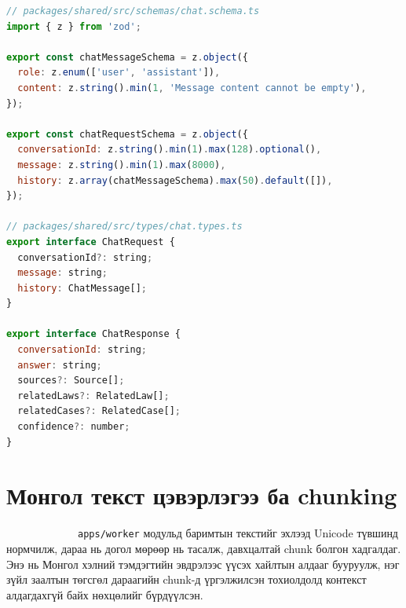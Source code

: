 \documentclass[12pt,A4]{report}
\begin{document}
\begin{lstlisting}[language=JavaScript,
caption={Shared багц дахь хүсэлтийн схем ба хариултын төрөл}]
// packages/shared/src/schemas/chat.schema.ts
import { z } from 'zod';

export const chatMessageSchema = z.object({
  role: z.enum(['user', 'assistant']),
  content: z.string().min(1, 'Message content cannot be empty'),
});

export const chatRequestSchema = z.object({
  conversationId: z.string().min(1).max(128).optional(),
  message: z.string().min(1).max(8000),
  history: z.array(chatMessageSchema).max(50).default([]),
});

// packages/shared/src/types/chat.types.ts
export interface ChatRequest {
  conversationId?: string;
  message: string;
  history: ChatMessage[];
}

export interface ChatResponse {
  conversationId: string;
  answer: string;
  sources?: Source[];
  relatedLaws?: RelatedLaw[];
  relatedCases?: RelatedCase[];
  confidence?: number;
}
\end{lstlisting}

\section{Монгол текст цэвэрлэгээ ба chunking}

\ \ \ \ \ \ \ \ \  \ \ \ \ \texttt{apps/worker} модульд
баримтын текстийг эхлээд Unicode түвшинд нормчилж, дараа нь
догол мөрөөр нь тасалж, давхцалтай chunk болгон хадгалдаг.
Энэ нь Монгол хэлний тэмдэгтийн эвдрэлээс үүсэх хайлтын
алдааг бууруулж, нэг зүйл заалтын төгсгөл дараагийн chunk-д
үргэлжилсэн тохиолдолд контекст алдагдахгүй байх нөхцөлийг
бүрдүүлсэн.
\end{document}
